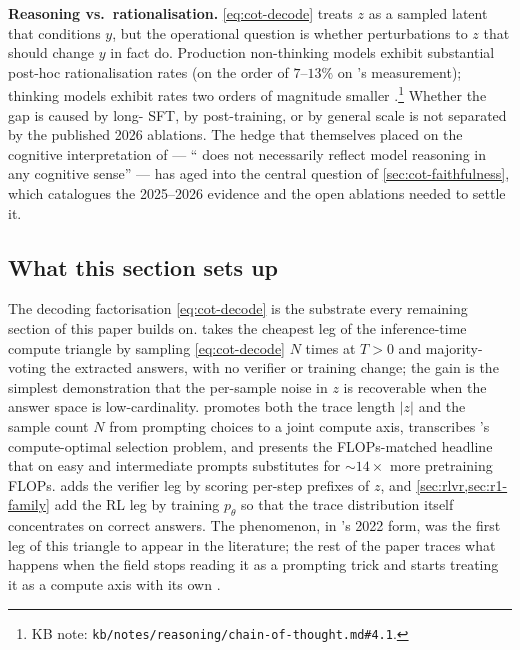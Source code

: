 \begin{contradiction}
\textbf{Reasoning vs.\ rationalisation.} \cref{eq:cot-decode} treats
$z$ as a sampled latent that conditions $y$, but the operational
question is whether perturbations to $z$ that should change $y$ in fact
do. Production non-thinking models exhibit substantial post-hoc
rationalisation rates (on the order of $7$--$13\%$ on
\citet{mehta2026-faithfulness-scaling}'s measurement); thinking models
exhibit rates two orders of magnitude smaller
\citep[\S 4]{mehta2026-faithfulness-scaling}.\footnote{KB note:
\nolinkurl{kb/notes/reasoning/chain-of-thought.md#4.1}.} Whether the gap
is caused by long- SFT, by  post-training, or by general scale
is not separated by the published 2026 ablations. The hedge that
\citet[\S 6]{wei2022-cot} themselves placed on the cognitive
interpretation of  --- `` does not necessarily
reflect model reasoning in any cognitive sense'' --- has aged into the
central question of \cref{sec:cot-faithfulness}, which catalogues
the 2025--2026 evidence and the open ablations needed to settle it.
\end{contradiction}

\subsection{What this section sets up}
\label{sec:cot-forward}

The decoding factorisation \cref{eq:cot-decode} is the substrate every
remaining section of this paper builds on. 
takes the cheapest leg of the inference-time compute triangle by
sampling \cref{eq:cot-decode} $N$ times at $T > 0$ and majority-voting
the extracted answers, with no verifier or training change; the gain
is the simplest demonstration that the per-sample noise in $z$ is
recoverable when the answer space is low-cardinality.
 promotes both the trace length $|z|$ and
the sample count $N$ from prompting choices to a joint compute axis,
transcribes \citet{snell2024}'s compute-optimal selection problem, and
presents the FLOPs-matched headline that on easy and intermediate
prompts  substitutes for ${\sim}14\times$ more
pretraining FLOPs.  adds the verifier
leg by scoring per-step prefixes of $z$, and \cref{sec:rlvr,sec:r1-family}
add the RL leg by training $p_\theta$ so that the trace distribution
itself concentrates on correct answers. The  phenomenon, in
\citet{wei2022-cot}'s 2022 form, was the first leg of this triangle to
appear in the literature; the rest of the paper traces what happens
when the field stops reading it as a prompting trick and starts
treating it as a compute axis with its own .
